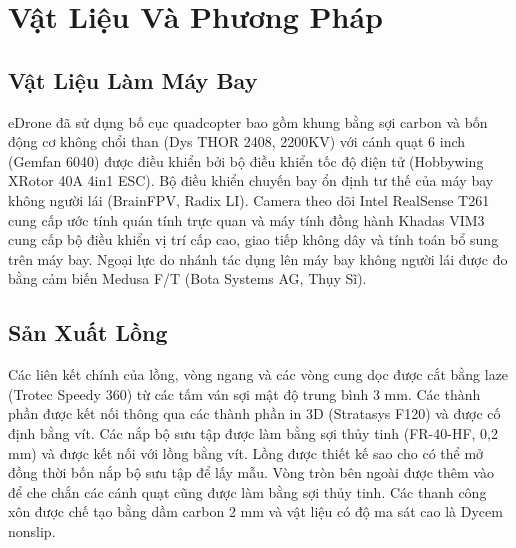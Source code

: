 \documentclass[12pt,a4paper]{article}
\begin{document}
\section{Vật Liệu Và Phương Pháp}
\subsection{Vật Liệu Làm Máy Bay}
eDrone đã sử dụng bố cục quadcopter bao gồm khung bằng sợi carbon và bốn động cơ không chổi than (Dys THOR 2408, 2200KV) với cánh quạt 6 inch (Gemfan 6040) được điều khiển bởi bộ điều khiển tốc độ điện tử (Hobbywing XRotor 40A 4in1 ESC). Bộ điều khiển chuyến bay ổn định tư thế của máy bay không người lái (BrainFPV, Radix LI). Camera theo dõi Intel RealSense T261 cung cấp ước tính quán tính trực quan và máy tính đồng hành Khadas VIM3 cung cấp bộ điều khiển vị trí cấp cao, giao tiếp không dây và tính toán bổ sung trên máy bay. Ngoại lực do nhánh tác dụng lên máy bay không người lái được đo bằng cảm biến Medusa F/T (Bota Systems AG, Thụy Sĩ).\\
\subsection{Sản Xuất Lồng}
Các liên kết chính của lồng, vòng ngang và các vòng cung dọc được cắt bằng laze (Trotec Speedy 360) từ các tấm ván sợi mật độ trung bình 3 mm. Các thành phần được kết nối thông qua các thành phần in 3D (Stratasys F120) và được cố định bằng vít. Các nắp bộ sưu tập được làm bằng sợi thủy tinh (FR-40-HF, 0,2 mm) và được kết nối với lồng bằng vít. Lồng được thiết kế sao cho có thể mở đồng thời bốn nắp bộ sưu tập để lấy mẫu. Vòng tròn bên ngoài được thêm vào để che chắn các cánh quạt cũng được làm bằng sợi thủy tinh. Các thanh công xôn được chế tạo bằng dầm carbon 2 mm và vật liệu có độ ma sát cao là Dycem nonslip.\\
\end{document}
